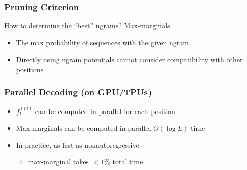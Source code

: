 \documentclass{beamer}
\begin{document}
\begin{frame}
\begin{center}
\begin{overlayarea}{\textwidth}{10cm}
\end{overlayarea}
\end{center}
\end{frame}

\begin{frame}
\frametitle{Pruning Criterion}
How to determine the “best” ngrams? Max-marginals.
\begin{itemize}
    \item The max probability of sequences with the given ngram
    \item Directly using ngram potentials cannot consider compatibility with other positions
\end{itemize}
\end{frame}

\begin{frame}
\frametitle{Parallel Decoding (on GPU/TPUs)}
\begin{itemize}
    \item<1-> $f_l^{(m)}$ can be computed in parallel for each position
    \item<2-> Max-marginals can be computed in parallel $O(\log L)$ time
    \item<4-> In practice, as fast as nonautoregressive
    \begin{itemize}
        \item max-marginal takes $<1\%$ total time
    \end{itemize}
\end{itemize}
\begin{center}
\end{center}
\end{frame}
\end{document}
